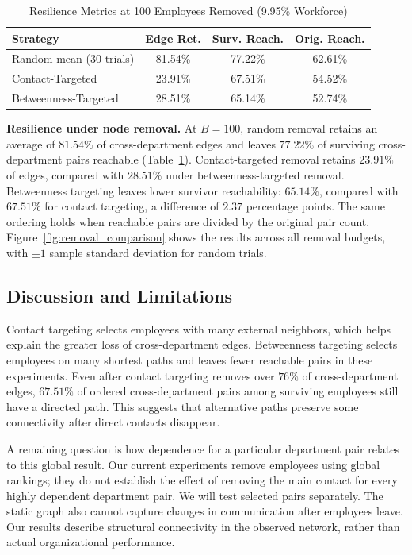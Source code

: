 \documentclass[conference]{IEEEtran}
\begin{document}
\begin{table}[htbp]
\caption{Resilience Metrics at 100 Employees Removed (9.95\% Workforce)}
\begin{center}
\footnotesize
\setlength{\tabcolsep}{3.5pt}
\begin{tabular}{lccc}
\toprule
\textbf{Strategy} & \textbf{Edge Ret.} & \textbf{Surv. Reach.} & \textbf{Orig. Reach.} \\
\midrule
Random mean (30 trials) & 81.54\% & 77.22\% & 62.61\% \\
Contact-Targeted     & 23.91\% & 67.51\% & 54.52\% \\
Betweenness-Targeted & 28.51\% & 65.14\% & 52.74\% \\
\bottomrule
\end{tabular}
\label{tab:removal_results}
\end{center}
\end{table}

\textbf{Resilience under node removal.}
At $B=100$, random removal retains an average of $81.54\%$ of cross-department edges and leaves $77.22\%$ of surviving cross-department pairs reachable (Table~\ref{tab:removal_results}). Contact-targeted removal retains $23.91\%$ of edges, compared with $28.51\%$ under betweenness-targeted removal. Betweenness targeting leaves lower survivor reachability: $65.14\%$, compared with $67.51\%$ for contact targeting, a difference of $2.37$ percentage points. The same ordering holds when reachable pairs are divided by the original pair count. Figure~\ref{fig:removal_comparison} shows the results across all removal budgets, with $\pm1$ sample standard deviation for random trials.

\subsection{Discussion and Limitations}
Contact targeting selects employees with many external neighbors, which helps explain the greater loss of cross-department edges. Betweenness targeting selects employees on many shortest paths and leaves fewer reachable pairs in these experiments. Even after contact targeting removes over $76\%$ of cross-department edges, $67.51\%$ of ordered cross-department pairs among surviving employees still have a directed path. This suggests that alternative paths preserve some connectivity after direct contacts disappear.

A remaining question is how dependence for a particular department pair relates to this global result. Our current experiments remove employees using global rankings; they do not establish the effect of removing the main contact for every highly dependent department pair. We will test selected pairs separately. The static graph also cannot capture changes in communication after employees leave. Our results describe structural connectivity in the observed network, rather than actual organizational performance.
\end{document}
